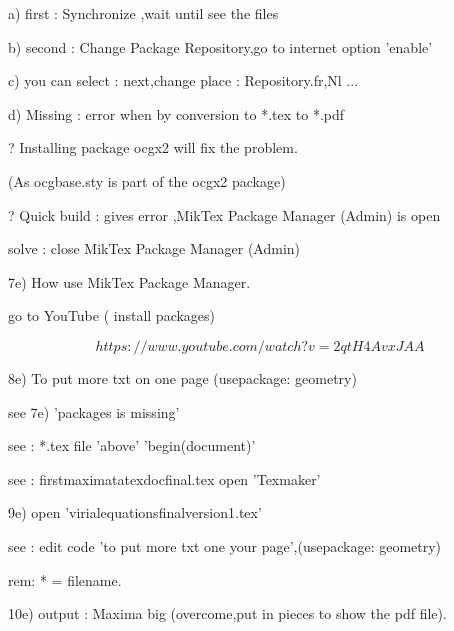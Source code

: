 \documentclass[12pt]{article}
\begin{document}
   a) first  : Synchronize ,wait until see the files
   
   b) second : Change Package Repository,go to internet option 'enable' 
   
   c) you can select : next,change place : Repository.fr,Nl ...
   
   d) Missing :  error when by conversion to *.tex  to *.pdf

   ? Installing package ocgx2 will fix the problem.
   
   (As ocgbase.sty is part of the ocgx2 package) 
   
   ? Quick build : gives error ,MikTex Package Manager (Admin) is open 
   
   solve : close  MikTex Package Manager (Admin)    
    
7e) How use MikTex Package Manager.

   go to YouTube ( install packages)
   
   $$ https://www.youtube.com/watch?v=2qtH4AvxJAA $$
   
8e) To put more txt on one page (usepackage: geometry)  

    see 7e) 'packages is missing'
    
    see : *.tex file 'above'  'begin(document)'
    
   see : firstmaximatatexdocfinal.tex open 'Texmaker'
   
9e)    open 'virialequationsfinalversion1.tex'

   see : edit code 'to put more txt one your page',(usepackage: geometry)
   
rem: * =  filename.

10e) output : Maxima big (overcome,put in pieces to show the pdf file).   
   
   
\end{document}
